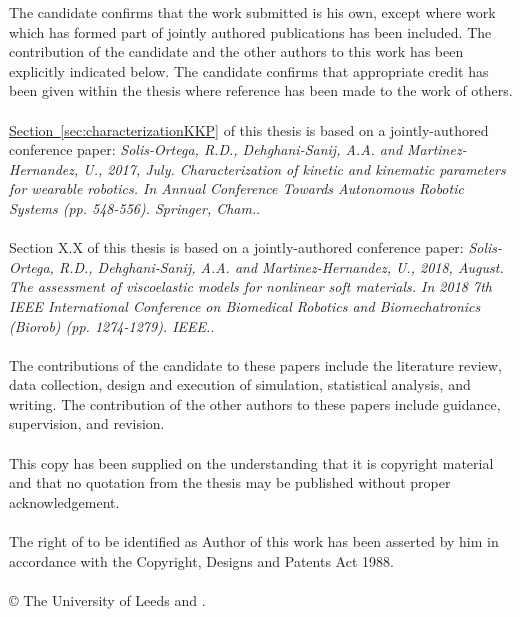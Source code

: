 
\begin{ipstatement}
The candidate confirms that the work submitted is his own, except where work which has formed part of jointly authored publications has been included. The contribution of the candidate and the other authors to this work has been explicitly indicated below. The candidate confirms that appropriate credit has been given within the thesis where reference has been made to the work of others.
\\
\\
\hyperref[sec:characterizationKKP]{Section~\ref*{sec:characterizationKKP}} of this thesis is based on a jointly-authored conference paper: \textit{Solis-Ortega, R.D., Dehghani-Sanij, A.A. and Martinez-Hernandez, U., 2017, July. Characterization of kinetic and kinematic parameters for wearable robotics. In Annual Conference Towards Autonomous Robotic Systems (pp. 548-556). Springer, Cham.}.
\\
\\
Section X.X of this thesis is based on a jointly-authored conference paper: \textit{Solis-Ortega, R.D., Dehghani-Sanij, A.A. and Martinez-Hernandez, U., 2018, August. The assessment of viscoelastic models for nonlinear soft materials. In 2018 7th IEEE International Conference on Biomedical Robotics and Biomechatronics (Biorob) (pp. 1274-1279). IEEE.}.
\\
\\
The contributions of the candidate to these papers include the literature review, data collection, design and execution of simulation, statistical analysis, and writing. The contribution of the other authors to these papers include guidance, supervision, and revision.
\\
\\
This copy has been supplied on the understanding that it is copyright material and that no quotation from the thesis may be published without proper acknowledgement.
\\
\\
The right of \theAuthor{} to be identified as Author of this work has been asserted by him in accordance with the Copyright, Designs and Patents Act 1988.
\\
\\
\copyright{} \yeardate{\today} The University of Leeds and \theAuthor{}.

\label{ips}
\end{ipstatement}


